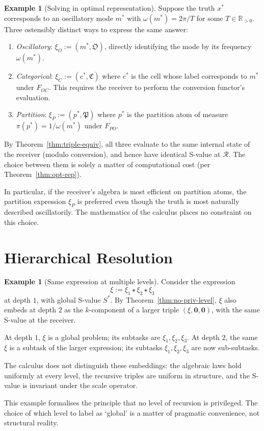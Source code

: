 \documentclass[twocolumn,11pt,a4paper]{article}
\theoremstyle{thmstyle}
\theoremstyle{thmstyle}
\theoremstyle{definition}
\newtheorem{example}[theorem]{Example}
\theoremstyle{remark}
\newcommand{\Real}{\mathbb{R}}
\newcommand{\receiver}{\mathcal{R}}
\newcommand{\Sscalar}{S}
\begin{document}
\begin{example}[Solving in optimal representation]
\label{ex:opt-rep}
Suppose the truth $x^{*}$ corresponds to an
oscillatory mode $m^{*}$ with $\omega(m^{*}) =
2\pi/T$ for some $T \in \Real_{>0}$.  Three
ostensibly distinct ways to express the same answer:
\begin{enumerate}[nosep,label=(\arabic*)]
\item \emph{Oscillatory}: $\xi_{O} := (m^{*}, \mathfrak{O})$,
      directly identifying the mode by its frequency
      $\omega(m^{*})$.
\item \emph{Categorical}: $\xi_{C} := (c^{*},
      \mathfrak{C})$ where $c^{*}$ is the cell whose
      label corresponds to $m^{*}$ under
      $F_{OC}$.  This requires the receiver to
      perform the conversion functor's evaluation.
\item \emph{Partition}: $\xi_{P} := (p^{*},
      \mathfrak{P})$ where $p^{*}$ is the partition
      atom of measure $\pi(p^{*}) = 1/\omega(m^{*})$
      under $F_{PO}$.
\end{enumerate}

By Theorem~\ref{thm:triple-equiv}, all three
evaluate to the same internal state of the receiver
(modulo conversion), and hence have identical
S-value at $\receiver$.  The choice between them is
solely a matter of computational cost (per
Theorem~\ref{thm:opt-rep}).

In particular, if the receiver's algebra is most
efficient on partition atoms, the partition
expression $\xi_{P}$ is preferred even though the
truth is most naturally described oscillatorily.
The mathematics of the calculus places no constraint
on this choice.
\end{example}

\section{Hierarchical Resolution}
\label{sec:hierarchical-example}

\begin{example}[Same expression at multiple levels]
\label{ex:hierarchical}
Consider the expression
\[
\xi := \xi_{1} \star \xi_{2} \star \xi_{3}
\]
at depth $1$, with global S-value $\Sscalar^{*}$.
By Theorem~\ref{thm:no-priv-level}, $\xi$ also
embeds at depth $2$ as the $k$-component of a
larger triple $(\xi, \mathbf{0}, \mathbf{0})$, with
the same S-value at the receiver.

At depth $1$, $\xi$ is a global problem; its
subtasks are $\xi_{1}, \xi_{2}, \xi_{3}$.  At
depth $2$, the same $\xi$ is a subtask of the
larger expression; its subtasks $\xi_{1}, \xi_{2},
\xi_{3}$ are now sub-subtasks.

The calculus does not distinguish these embeddings:
the algebraic laws hold uniformly at every level,
the recursive triples are uniform in structure,
and the S-value is invariant under the scale
operator.

This example formalises the principle that no level
of recursion is privileged.  The choice of which
level to label as `global' is a matter of pragmatic
convenience, not structural reality.
\end{example}
\end{document}
